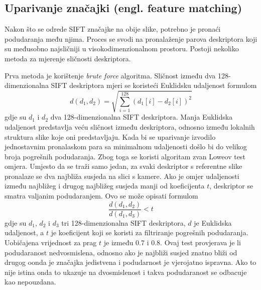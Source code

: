 \subsection{Uparivanje značajki (engl. feature matching)}

Nakon što se odrede SIFT značajke na obije slike, potrebno je pronaći podudaranja među njima. Proces se svodi na pronalaženje parova deskriptora koji su međusobno najsličniji u visokodimenzionalnom prostoru. Postoji nekoliko metoda za mjerenje sličnosti deskriptora.

Prva metoda je korištenje \textit{brute force} algoritma. Sličnost između dva 128-dimenzionalna SIFT deskriptora mjeri se koristeći Euklidsku udaljenost formulom
\begin{equation}
    d(d_1, d_2) = \sqrt{\sum_{i=1}^{128} (d_1[i] - d_2[i])^2}
\end{equation}
gdje su $d_1$ i $d_2$ dva 128-dimenzionalna SIFT deskriptora. Manja Euklidska udaljenost predstavlja veću sličnost između deskriptora, odnosno između lokalnih struktura slike koje oni predstavljaju.
Kada bi se uparivanje izvodilo jednostavnim pronalaskom para sa minimalnom udaljenosti došlo bi do velikog broja pogrešnih podudaranja. Zbog toga se koristi algoritam zvan Loweov test omjera. Umjesto da se traži samo jedan, za svaki deskriptor s referentne slike pronalaze se dva najbliža susjeda na slici s kamere. Ako je omjer udaljenosti između najbližeg i drugog najbližeg susjeda manji od koeficijenta $t$, deskriptor se smatra valjanim podudaranjem. Ovo se može opisati formulom
\begin{equation}
    \frac{d(d_1, d_2)}{d(d_1, d_3)} < t
\end{equation}
gdje su $d_1$, $d_2$ i $d_3$ tri 128-dimenzionalna SIFT deskriptora, $d$ je Euklidska udaljenost, a $t$ je koeficijent koji se koristi za filtriranje pogrešnih podudaranja. Uobičajena vrijednost za prag $t$ je između 0.7 i 0.8. Ovaj test provjerava je li podudaranost nedvosmislena, odnosno ako je najbliži susjed znatno bliži od drugog oonda je značajka jedistvena i podudarnost je vjerojatno ispravna. Ako to nije istina onda to ukazuje na dvosmislenost i takva podudaranost se odbacuje kao nepouzdana.

